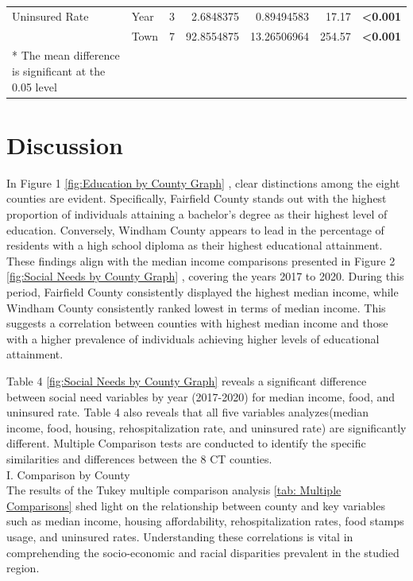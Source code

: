 \documentclass[12pt]{article}
\begin{document}
\begin{table}[]
{\begin{tabular}{llrrrrl}
  Uninsured Rate         & Year                   & 3                               & 2.6848375                                   & 0.89494583                               & 17.17                                & \textbf{\textless0.001}                     \\
                         & Town                   & 7                               & 92.8554875                                  & 13.26506964                              & 254.57                               & \textbf{\textless0.001}    \\                
  * The mean difference is significant at the 0.05 level\\
  \end{tabular}%
  }
  \end{table}

\section{Discussion}\label{sec:disc}


In Figure 1
\ref{fig:Education by County Graph}
, clear distinctions among the eight counties are evident. 
Specifically, Fairfield County stands out with the highest proportion of individuals attaining a bachelor's 
degree as their highest level of education. Conversely, Windham County appears to lead in the percentage of 
residents with a high school diploma as their highest educational attainment. These findings align with the median income 
comparisons presented in Figure 2
\ref{fig:Social Needs by County Graph}
, covering the years 2017 to 2020. 
During this period, Fairfield County consistently displayed the highest median income, while Windham County 
consistently ranked lowest in terms of median income. This suggests a correlation between counties with
highest median income and those with a higher prevalence of individuals achieving higher levels of educational attainment.


Table 4
\ref{fig:Social Needs by County Graph}
 reveals a significant difference between 
social need variables by year (2017-2020) for median income, food, and uninsured rate. Table 4 also 
reveals that all five variables analyzes(median income, food, housing, rehospitalization rate, and 
uninsured rate) are significantly different. Multiple Comparison tests are conducted to identify the 
specific similarities and differences between the 8 CT counties.
\\
I. Comparison by County
\\
The results of the Tukey multiple comparison analysis
\ref{tab: Multiple Comparisons}
 shed light on the relationship between county and key 
variables such as median income, housing affordability, rehospitalization rates, food stamps usage, and
uninsured rates. Understanding these correlations is vital in comprehending 
the socio-economic and racial disparities prevalent in the studied region.
\end{document}
